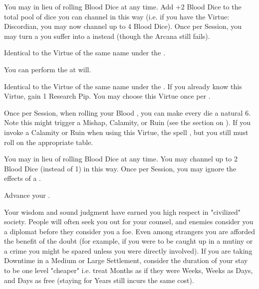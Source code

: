 \begin{multicols*}{2}



You may  in lieu of rolling Blood Dice at any time. Add +2 Blood Dice to the total pool of dice you can channel in this way (i.e. if you have the Virtue: Discordian, you may now channel up to 4 Blood Dice). Once per Session, you may turn a  you suffer into a  instead (though the Arcana still fails).


Identical to the Virtue of the same name under the .


You can perform the  at will.


Identical to the Virtue of the same name under the . If you already know this Virtue, gain 1 Research Pip. You may choose this Virtue once per \LVL.


\newpage


Once per Session, when rolling your Blood \POOL, you can make every die a natural 6.  Note this might trigger a Mishap, Calamity, or Ruin (see the section on ).  If you invoke a Calamity or Ruin when using this Virtue, the spell , but you still must roll on the appropriate table.


   You may  in lieu of rolling Blood Dice at any time. You may channel up to 2 Blood Dice (instead of 1) in this way. Once per Session, you may ignore the effects of a .



Advance your \INGENUITY \DCUP. 


Your wisdom and sound judgment have earned you high respect in "civilized" society. People will often seek you out for your counsel, and enemies consider you a diplomat before they consider you a foe. Even among strangers you are afforded the benefit of the doubt (for example, if you were to be caught up in a mutiny or a crime you might be spared unless you were directly involved). If you are taking Downtime in a Medium or Large Settlement, consider the duration of your stay to be one level "cheaper" i.e. treat Months as if they were Weeks, Weeks as Days, and Days as free (staying for Years still incurs the same cost).


\end{multicols*}

